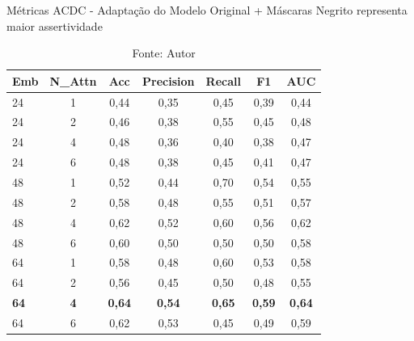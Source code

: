 \begin{table}[htbp]
\centering
\caption{Métricas ACDC - Adaptação do Modelo Original + Máscaras
\newline Negrito representa maior assertividade}
\begin{tabular}{lcccccc}
\toprule
\textbf{Emb} & \textbf{N\_Attn} & \textbf{Acc} & \textbf{Precision} & \textbf{Recall} & \textbf{F1} & \textbf{AUC} \\
\midrule
24 & 1 & 0,44 & 0,35 & 0,45 & 0,39 & 0,44 \\
24 & 2 & 0,46 & 0,38 & 0,55 & 0,45 & 0,48 \\
24 & 4 & 0,48 & 0,36 & 0,40 & 0,38 & 0,47 \\
24 & 6 & 0,48 & 0,38 & 0,45 & 0,41 & 0,47 \\
\hline
48 & 1 & 0,52 & 0,44 & 0,70 & 0,54 & 0,55 \\
48 & 2 & 0,58 & 0,48 & 0,55 & 0,51 & 0,57 \\
48 & 4 & 0,62 & 0,52 & 0,60 & 0,56 & 0,62 \\
48 & 6 & 0,60 & 0,50 & 0,50 & 0,50 & 0,58 \\
\hline
64 & 1 & 0,58 & 0,48 & 0,60 & 0,53 & 0,58 \\
64 & 2 & 0,56 & 0,45 & 0,50 & 0,48 & 0,55 \\
\textbf{64} & \textbf{4} & \textbf{0,64} & \textbf{0,54} & \textbf{0,65} & \textbf{0,59} & \textbf{0,64} \\
64 & 6 & 0,62 & 0,53 & 0,45 & 0,49 & 0,59 \\
\bottomrule
\end{tabular}
\caption*{Fonte: Autor}
\label{tab:metrics_acdc_orig_mask}
\end{table}


